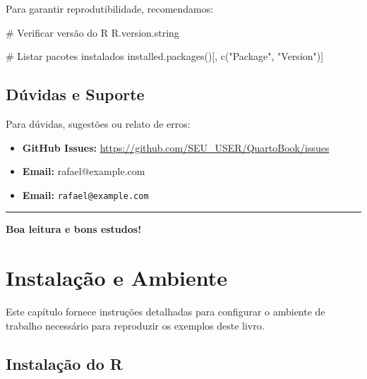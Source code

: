 \documentclass[
  letterpaper,
]{book}
\newenvironment{Shaded}{\begin{snugshade}}{\end{snugshade}}
\newcommand{\CommentTok}[1]{\textcolor[rgb]{0.37,0.37,0.37}{#1}}
\newcommand{\FunctionTok}[1]{\textcolor[rgb]{0.28,0.35,0.67}{#1}}
\newcommand{\NormalTok}[1]{\textcolor[rgb]{0.00,0.23,0.31}{#1}}
\newcommand{\StringTok}[1]{\textcolor[rgb]{0.13,0.47,0.30}{#1}}
\providecommand{\tightlist}{%
  \setlength{\itemsep}{0pt}\setlength{\parskip}{0pt}}\usepackage{longtable,booktabs,array}
\begin{document}
Para garantir reprodutibilidade, recomendamos:

\begin{Shaded}
\begin{Highlighting}[]
\CommentTok{\# Verificar versão do R}
\NormalTok{R.version.string}

\CommentTok{\# Listar pacotes instalados}
\FunctionTok{installed.packages}\NormalTok{()[, }\FunctionTok{c}\NormalTok{(}\StringTok{"Package"}\NormalTok{, }\StringTok{"Version"}\NormalTok{)]}
\end{Highlighting}
\end{Shaded}

\section*{Dúvidas e Suporte}\label{duxfavidas-e-suporte}


Para dúvidas, sugestões ou relato de erros:

\begin{itemize}
\tightlist
\item
  \textbf{GitHub Issues:}
  \url{https://github.com/SEU_USER/QuartoBook/issues}
\item
  \textbf{Email:} rafael@example.com
\item
  \textbf{Email:} \texttt{rafael@example.com}
\end{itemize}

\begin{center}\rule{0.5\linewidth}{0.5pt}\end{center}

\textbf{Boa leitura e bons estudos!} 🚀


\chapter*{Instalação e Ambiente}\label{instalauxe7uxe3o-e-ambiente}


Este capítulo fornece instruções detalhadas para configurar o ambiente
de trabalho necessário para reproduzir os exemplos deste livro.

\section*{Instalação do R}\label{instalauxe7uxe3o-do-r}
\end{document}
